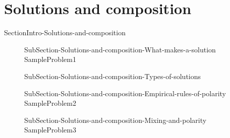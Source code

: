 \documentclass[main.tex]{subfiles} %
\begin{document}
\section{Solutions and composition}{SectionIntro-Solutions-and-composition}
\sloppy\begin{description}
\item[]{SubSection-Solutions-and-composition-What-makes-a-solution}
{SampleProblem1}
\item[] {SubSection-Solutions-and-composition-Types-of-solutions}
 \hspace{-0cm}{Figure-Dissolution}
\item[] {SubSection-Solutions-and-composition-Empirical-rules-of-polarity}
{SampleProblem2}
\item[]{SubSection-Solutions-and-composition-Mixing-and-polarity}
 \hspace{2cm}{Table-Polarity-and-mixing}	
{SampleProblem3}
\end{description}
\end{document}

